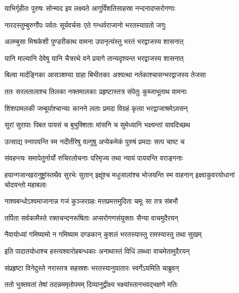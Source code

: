 \twolineshloka
{याभिर्गृहीतः पुरुषः सोन्माद इव लक्ष्यते}
{आगुर्विंशतिसाहस्रा नन्दनादप्सरोगणाः} %

\twolineshloka
{नारदस्तुम्बुरुर्गोपः पर्वतः सूर्यवर्चसः}
{एते गन्धर्वराजानो भरतस्याग्रतो जगुः} %

\twolineshloka
{अलम्बुसा मिश्रकेशी पुण्डरीकाथ वामना}
{उपानृत्यंस्तु भरतं भरद्वाजस्य शासनात्} %

\twolineshloka
{यानि माल्यानि देवेषु यानि चैत्ररथे वने}
{प्रयागे तान्यदृश्यन्त भरद्वाजस्य शासनात्} %

\twolineshloka
{बिल्वा मार्दङ्गिका आसञ्शम्या ग्राहा बिभीतकाः}
{अश्वत्था नर्तकाश्चासन्भरद्वाजस्य तेजसा} %

\twolineshloka
{ततः सरलतालाश्च तिलका नक्तमालकाः}
{प्रहृष्टास्तत्र संपेतुः कुब्जाभूताथ वामनाः} %

\twolineshloka
{शिंशपामलकी जम्बूर्याश्चान्याः कानने लताः}
{प्रमदा विग्रहं कृत्वा भरद्वाजाश्रमेऽवसन्} %

\twolineshloka
{सुरां सुरापाः पिबत पायसं च बुभुक्शिताः}
{मांसनि च सुमेध्यानि भक्ष्यन्तां यावदिच्छथ} %

\twolineshloka
{उत्साद्य स्नापयन्ति स्म नदीतीरेषु वल्गुषु}
{अप्येकमेकं पुरुषं प्रमदाः सत्प चाष्ट च} %

\twolineshloka
{संवहन्त्यः समापेतुर्नार्यो रुचिरलोचनाः}
{परिमृज्य तथा न्यायं पाययन्ति वराङ्गनाः} %

\threelineshloka
{हयान्गजान्खरानुष्ट्रांस्तथैव सुरभेः सुतान्}
{इक्षूंश्च मधुजालांश्च भोजयन्ति स्म वाहनान्}
{इक्ष्वाकुवरयोधानां चोदयन्तो महाबलाः} %

\twolineshloka
{नाश्वबन्धोऽश्वमाजानान्न गजं कुञ्जरग्रहः}
{मत्तप्रमत्तमुदिता चमूः सा तत्र संबभौ} %

\twolineshloka
{तर्पिता सर्वकामैस्ते रक्तचन्दनरूषिताः}
{अप्सरोगणसंयुक्ताः सैन्या वाचमुदैरयन्} %

\twolineshloka
{नैवायोध्यां गमिष्यामो न गमिष्याम दण्डकान्}
{कुशलं भरतस्यास्तु रामस्यास्तु तथा सुखम्} %

\twolineshloka
{इति पादातयोधाश्च हस्त्यश्वारोहबन्धकाः}
{अनाथास्तं विधिं लब्ध्वा वाचमेतामुदैरयन्} %

\twolineshloka
{संप्रहृष्टा विनेदुस्ते नरास्तत्र सहस्रशः}
{भरतस्यानुयातारः स्वर्गेऽयमिति चाब्रुवन्} %

\twolineshloka
{ततो भुक्तवतां तेषां तदन्नममृतोपमम्}
{दिव्यानुद्वीक्ष्य भक्ष्यांस्तानभवद्भक्षणे मतिः} %

